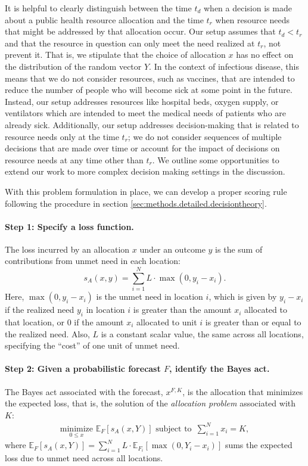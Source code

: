 \documentclass{article}
\begin{document}
It is helpful to clearly distinguish between the time $t_d$ when a decision is made about a public health
resource allocation and the time $t_r$ when resource needs that might be addressed by that allocation occur. Our
setup assumes that $t_d < t_r$ and that the resource in question can only meet the need realized at $t_r$, not prevent
it. That is, we stipulate that the choice of allocation $x$ has no effect on the distribution of the random vector $Y$. In the
context of infectious disease, this means that we do not consider resources, such as vaccines, that are intended to
reduce the number of people who will become sick at some point in the future. Instead, our setup addresses resources
like hospital beds, oxygen supply, or ventilators which are intended to meet the medical needs of patients who are
already sick. Additionally, our setup addresses decision-making that is related to resource needs only at the time
$t_r$; we do not consider sequences of multiple decisions that are made over time or account for the impact of decisions
on resource needs at any time other than $t_r$. We outline some opportunities to extend our work to more complex
decision making settings in the discussion.

With this problem formulation in place, we can develop a proper scoring rule following the procedure in section
\ref{sec:methods.detailed.decisiontheory}.

\paragraph{Step 1: Specify a loss function.} The loss incurred by an allocation $x$ under an outcome $y$ is the sum of
contributions from unmet need in each location:
\begin{equation}
  s_A(x, y) = \sum_{i=1}^N L \cdot \max(0, y_i - x_i). \label{eqn:loss_fn}
\end{equation}
Here, $\max(0, y_i - x_i)$ is the unmet need in location $i$, which is given by $y_i - x_i$ if the realized need $y_i$
in location $i$ is greater than the amount $x_i$ allocated to that location, or $0$ if the amount $x_i$ allocated to
unit $i$ is greater than or equal to the realized need. Also, $L$ is a constant scalar value, the same across all
locations, specifying the ``cost'' of one unit of unmet need.

\paragraph{Step 2: Given a probabilistic forecast $F$, identify the Bayes act.} The Bayes act associated with the
forecast, $x^{F,K}$, is the allocation that minimizes the expected loss, that is, the solution of the \emph{allocation
problem} associated with $K$:
\begin{align}
  \underset{0 \leq x}{\mathrm{minimize}}\,\, \mathbb{E}_{F} [s_A(x, Y)] \text{ subject to }
  \, \sum_{i=1}^N x_i = K, \label{eqn:AP}
\end{align}
where $\mathbb{E}_{F} [s_A(x, Y)] = \sum_{i=1}^{N} L \cdot \mathbb{E}_{F_i}[\max(0, Y_i - x_i)]$ sums the expected loss
due to unmet need across all locations.
\end{document}
